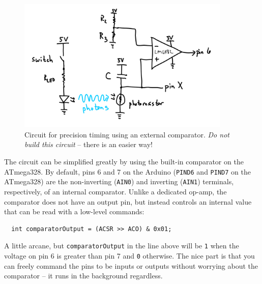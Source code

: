 \documentclass[11pt]{article} %
\begin{document}
\begin{figure}[htbp]
\begin{center}
\includegraphics[width=4in]{figures/comp_rc}
\caption{Circuit for precision timing using an external comparator. \emph{Do not build this circuit} -- there is an easier way!}
\label{fig:comparator.rc}
\end{center}
\end{figure}

The circuit can be simplified greatly by using the built-in comparator on the ATmega328. By default, pins 6 and 7 on the Arduino (\verb|PIND6| and \verb|PIND7| on the ATmega328) are the non-inverting (\verb|AIN0|) and inverting (\verb|AIN1|) terminals, respectively, of an internal comparator. Unlike a dedicated op-amp, the comparator does not have an output pin, but instead controls an internal value that can be read with a low-level commands:

\begin{verbatim}
  int comparatorOutput = (ACSR >> ACO) & 0x01;
\end{verbatim}

A little arcane, but \verb|comparatorOutput| in the line above will be \verb|1| when the voltage on pin 6 is greater than pin 7 and \verb|0| otherwise. The nice part is that you can freely command the pins to be inputs or outputs without worrying about the comparator -- it runs in the background regardless.
\end{document}
